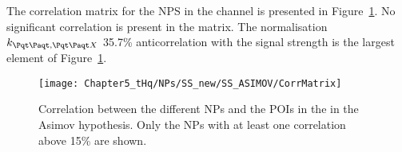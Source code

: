  


The correlation matrix for the NPS in the \dilepSStau channel is presented in Figure~\ref{fig:ChaptH:Asimov:SS:Correlation}. 
No significant correlation is present in the matrix.
The normalisation $k_{\ttbar,  \ttX}$ 35.7\% anticorrelation with the signal strength 
is the largest element of Figure~\ref{fig:ChaptH:Asimov:SS:Correlation}.



\begin{figure}[h]
\centering
 \texttt{[image: Chapter5\_tHq/NPs/SS\_new/SS\_ASIMOV/CorrMatrix]}
\caption{Correlation between the different NPs and the POIs in the \dilepSStau in the Asimov hypothesis. 
Only the NPs with at least one correlation above 15\% are shown.} 
\label{fig:ChaptH:Asimov:SS:Correlation}
\end{figure}

